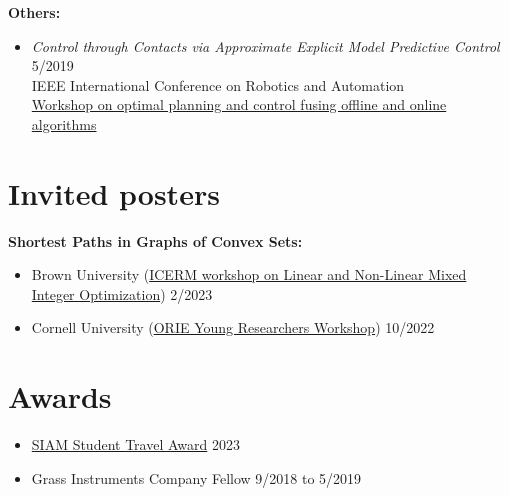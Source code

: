 \documentclass[11pt,a4paper,sans]{moderncv}
\begin{document}
\vspace{5pt}

\textbf{Others:}

\vspace{5pt}

\begin{itemize}

\item \textit{Control through Contacts via Approximate Explicit Model Predictive Control} \hfill 5/2019 \\
IEEE International Conference on Robotics and Automation \\
\href{https://sites.google.com/mit.edu/icra19ws/speakers?authuser=0}{\color{cyan}Workshop  on optimal planning and control fusing offline and online algorithms}

\end{itemize}

\section{Invited posters}

\vspace{5pt}

\textbf{Shortest Paths in Graphs of Convex Sets:}

\vspace{5pt}

\begin{itemize}

\item
Brown University
(\href{https://icerm.brown.edu/programs/sp-s23/w1/}{\color{cyan}ICERM workshop on Linear and Non-Linear Mixed Integer Optimization})
\hfill 2/2023

\item
Cornell University
(\href{https://www.orie.cornell.edu/orie-events/young-researchers-workshop}{\color{cyan}ORIE Young Researchers Workshop})
\hfill 10/2022

\end{itemize}

\section{Awards}

\vspace{5pt}

\begin{itemize}

\item  \href{https://www.siam.org/conferences/conference-support/siam-student-travel-awards}{\color{cyan}SIAM Student Travel Award} \hfill 2023

\item Grass Instruments Company Fellow \hfill 9/2018 to 5/2019

\end{itemize}
\end{document}
